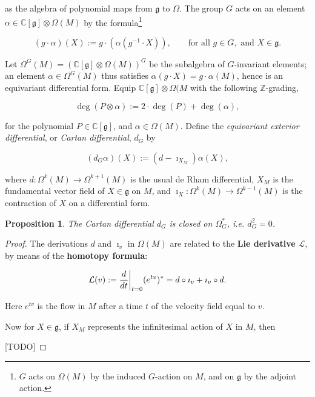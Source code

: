 \documentclass{article}
\newtheorem{prop}[theorem]{Proposition}
\newcommand{\ie}{\emph{i.e.} }
\newcommand{\ra}{\rightarrow}
\newcommand{\W}{\Omega}
\newcommand{\CC}{\mathbb{C}}
\newcommand{\ZZ}{\mathbb{Z}}
\newcommand{\mcL}{\mathcal{L}}
\newcommand{\mfg}{\mathfrak{g}}
\newcommand{\mc}[1]{\mathcal{#1}}
\newcommand\restr[2]{{%
		\left.\kern-\nulldelimiterspace %
		#1 %
		\vphantom{\big|} %
		\right|_{#2} %
}}
\begin{document}
as the algebra of polynomial maps from $\mfg$ to $\W$. The group $G$ acts on an element $\alpha \in \CC[\mfg] \otimes \W(M)$ by the formula\footnote{$G$ acts on $\W(M)$ by the induced $G$-action on $M$, and on $\mfg$ by the adjoint action.}

\begin{equation*}
	(g \cdot \alpha)(X) := g \cdot \left( \alpha ( g^{-1} \cdot X )  \right), \qquad \text{for all } g \in G, \text{ and } X \in \mfg.
\end{equation*}

Let $\W^{G}(M) = \left( \CC[\mfg] \otimes \W(M) \right)^{G}$ be the subalgebra of $G$-invariant elements; an element $\alpha \in \W^{G}(M)$ thus satisfies $\alpha(g \cdot X) = g\cdot \alpha(M)$, hence is an equivariant differential form. Equip $\CC[\mfg] \otimes \W(M$ with the following $\ZZ$-grading,

\begin{equation*}
	\deg(P \otimes \alpha) := 2\cdot \deg(P) + \deg(\alpha),
\end{equation*}

for the polynomial $P \in \CC[\mfg]$, and $\alpha \in \W(M)$. Define the \emph{equivariant exterior differential}, or \emph{Cartan differential}, $d_{G}$ by

\begin{equation*}
	(d_{G}\alpha)(X) := (d - \imath_{X_{M}}) \alpha(X),
\end{equation*}

where $d :\W^{k}(M) \ra \W^{k+1}(M)$ is the usual de Rham differential, $X_{M}$ is the fundamental vector field of $X \in \mfg$ on $M$, and $\imath_{X} : \W^{k}(M) \ra \W^{k-1}(M)$ is the contraction of $X$ on a differential form.

\begin{prop}
	The Cartan differential $d_{G}$ is closed on $\W_{G}^{\ast}$, \ie $d_{G}^{2} = 0$.
\end{prop}

\begin{proof}
	
	The derivations $d$ and $\imath_{v}$ in $\W(M)$ are related to the \textbf{Lie derivative} $\mcL$, by means of the \textbf{homotopy formula}:
	
	\begin{equation*}
		\mc{L}(v) := \restr{\frac{d}{dt}}{t = 0} (e^{tv})^{\ast} = d \circ \imath_{v} + \imath_{v} \circ d.
	\end{equation*}
	
	Here $e^{tv}$ is the flow in $M$ after a time $t$ of the velocity field equal to $v$.
	
	Now for $X \in \mfg$, if $X_{M}$ represents the infinitesimal action of $X$ in $M$, then 
	
	[TODO]
	
\end{proof}
\end{document}
